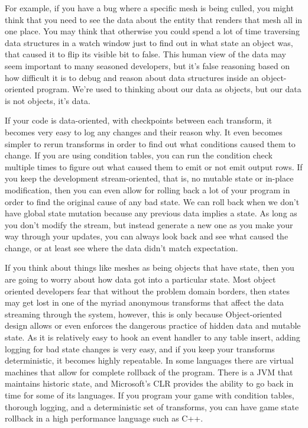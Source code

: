 For example, if you have a bug where a specific mesh is being culled, you might
think that you need to see the data about the entity that renders that mesh all
in one place. You may think that otherwise you could spend a lot of time
traversing data structures in a watch window just to find out in what state an
object was, that caused it to flip its visible bit to false. This human view of
the data may seem important to many seasoned developers, but it's false
reasoning based on how difficult it is to debug and reason about data
structures inside an object-oriented program. We're used to thinking about our
data as objects, but our data is not objects, it's data.

If your code is data-oriented, with checkpoints between each transform, it
becomes very easy to log any changes and their reason why. It even becomes
simpler to rerun transforms in order to find out what conditions caused them to
change. If you are using condition tables, you can run the condition check
multiple times to figure out what caused them to emit or not emit output rows.
If you keep the development stream-oriented, that is, no mutable state or
in-place modification, then you can even allow for rolling back a lot of your
program in order to find the original cause of any bad state. We can roll back
when we don't have global state mutation because any previous data implies a
state. As long as you don't modify the stream, but instead generate a new one
as you make your way through your updates, you can always look back and see
what caused the change, or at least see where the data didn't match
expectation.

If you think about things like meshes as being objects that have state, then
you are going to worry about how data got into a particular state. Most object
oriented developers fear that without the problem domain borders, then states
may get lost in one of the myriad anonymous transforms that affect the data
streaming through the system, however, this is only because Object-oriented
design allows or even enforces the dangerous practice of hidden data and
mutable state. As it is relatively easy to hook an event handler to any table
insert, adding logging for bad state changes is very easy, and if you keep your
transforms deterministic, it becomes highly repeatable. In some languages there
are virtual machines that allow for complete rollback of the program. There is
a JVM that maintains historic state, and Microsoft's CLR provides the ability
to go back in time for some of its languages. If you program your game with
condition tables, thorough logging, and a deterministic set of transforms, you
can have game state rollback in a high performance language such as C++.

